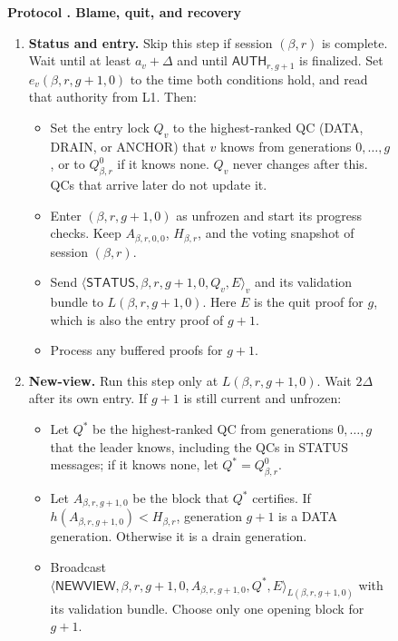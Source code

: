 \documentclass[11pt,a4paper]{article}
\newcommand{\RR}[1]{{\color{rrRed}#1}}
\newcommand{\tagg}[1]{\ensuremath{\mathsf{#1}}}
\newcounter{protocol}
\newenvironment{protocol}[3][htbp]{\begin{figure}[#1]\refstepcounter{protocol}\label{#2}
\begin{mdframed}[linewidth=.6pt,skipabove=0pt,skipbelow=0pt,
innertopmargin=7pt,innerbottommargin=7pt]\small
\textbf{Protocol \theprotocol. #3}\par\smallskip}{\end{mdframed}\end{figure}}
\begin{document}
\begin{protocol}{alg:recovery}{Blame, quit, and recovery}
\begin{enumerate}[label=\textbf{\arabic*)},itemsep=3pt]
\item \textbf{Status and entry.} \RR{Skip this step if session $(\beta,r)$ is
complete.} \RR{Wait until at least $a_v+\Delta$ and until
$\tagg{AUTH}_{r,g+1}$ is finalized. Set $e_v(\beta,r,g+1,0)$ to the time both
conditions hold, and read that authority from L1.} Then:
 \begin{itemize}
 \item Set the entry lock $Q_v$ to the highest-ranked QC
       (DATA\RR{, DRAIN,} or ANCHOR) that $v$ knows from generations
       $0,\ldots,g$\RR{, or to $Q_{\beta,r}^0$ if it knows none}.
       $Q_v$ never changes after this. QCs that arrive later do not
       update it.
 \item Enter $(\beta,r,g+1,0)$ as unfrozen and start its progress checks.
       \RR{Keep $A_{\beta,r,0,0}$, $H_{\beta,r}$, and the voting snapshot of session $(\beta,r)$.}
 \item Send $\langle\tagg{STATUS},\beta,r,g+1,0,Q_v,E\rangle_v$ and its
       validation bundle to $L(\beta,r,g+1,0)$. Here $E$ is the quit proof for
       $g$, which is also the entry proof of $g+1$.
 \item Process any buffered proofs for $g+1$.
 \end{itemize}

\item \textbf{New-view.} Run this step only at $L(\beta,r,g+1,0)$. Wait $2\Delta$
after its own entry. If $g+1$ is still current and unfrozen:
 \begin{itemize}
 \item Let $Q^*$ be the highest-ranked QC from generations $0,\ldots,g$
       that the leader knows, including the QCs in STATUS
       messages\RR{; if it knows none, let $Q^*=Q_{\beta,r}^0$}.
 \item Let $A_{\beta,r,g+1,0}$ be the block that $Q^*$ certifies. \RR{If
       $h(A_{\beta,r,g+1,0})<H_{\beta,r}$, generation $g+1$ is a DATA generation.
       Otherwise it is a drain generation.}
 \item Broadcast
       $\langle\tagg{NEWVIEW},\beta,r,g+1,0,A_{\beta,r,g+1,0},Q^*,E\rangle_{L(\beta,r,g+1,0)}$
       with its validation bundle. Choose only one opening block for
       $g+1$.
 \end{itemize}


\end{enumerate}
\end{protocol}
\end{document}
